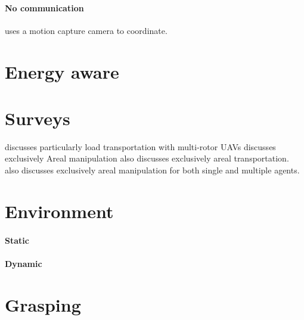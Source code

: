 \documentclass{article}
\begin{document}
		\paragraph{No communication}
			\cite{mohammadi-2018-decentralized-motion-control-in-a-cabled-based-multi-drone-load-transport-system,mohammadi-2020-control-of-multiple-quad-copters-with-a-cable-suspended-payload-subject-to-disturbances} uses a motion capture camera to coordinate. 
	\section{Energy aware}
		\cite{mohiuddin-2020-energy-distribution-in-dual-uav-collaborative-transportation-through-load-sharing}
	
	\section{Surveys}
		\cite{chung-2018-a-survey-on-aerial-swarm-robotics}
		\cite{coppola-2020-a-survey-on-swarming-with-micro-air-vehicles-fundamental-challenges-and-constraints}
		\cite{villa-2019-a-survey-on-load-transportation-using-multirotor-uavs} discusses particularly load transportation with multi-rotor UAVs 
		\cite{ruggiero-2018-introduction-to-the-special-issue-on-aerial-manipulation} discusses exclusively Areal manipulation
		\cite{tuci-2018-cooperative-object-transport-in-multi-robot-systems-a-review-of-the-state-of-the-art} also discusses exclusively areal transportation. 
		\cite{mohiuddin-2020-a-survey-of-single-and-multi-uav-aerial-manipulation} also discusses exclusively areal manipulation for both single and multiple agents. 
	\section{Environment}
		\paragraph{Static}
		\paragraph{Dynamic}
		\cite{spurny-2019-cooperative-transport-of-large-objects-by-a-pair-of-unmanned-aerial-systems-using-sampling-based-motion-planning}
		\cite{mora-2017-multi-robot-formation-control-and-object-transport-in-dynamic-environments-via-constrained-optimization}
	\section{Grasping}
\end{document}
